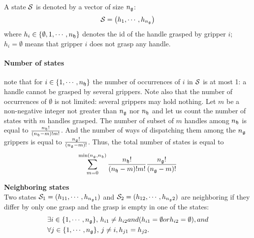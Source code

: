 A state $\mathcal{S}$ is denoted by a vector of size $n_{\mathfrak{g}}$:
\begin{equation}\label{eq:state}
\state = \left(h_1,\cdots,h_{\ngrippers}\right)
\end{equation}
where $h_i\in\{\emptyset,1,\cdots,n_{\mathfrak{h}}\}$ denotes the id of the handle grasped by gripper $i$; $h_i=\emptyset$ means that gripper $i$ does not grasp any handle.

\paragraph{Number of states} note that for $i\in\{1,\cdots,n_{\mathfrak{h}}\}$ the number of occurrences of $i$ in $\mathcal{S}$ is at most 1: a handle cannot be grasped by several grippers. Note also that the number of occurrences of $\emptyset$ is not limited: several grippers may hold nothing. Let $m$ be a non-negative integer not greater than $n_{\mathfrak{g}}$ nor $n_{\mathfrak{h}}$ and let us count the number of states with $m$ handles grasped. The number of subset of $m$ handles among $n_{\mathfrak{h}}$ is equal to $\frac{n_{\mathfrak{h}}!}{(n_{\mathfrak{h}}-m)!m!}$. And the number of ways of dispatching them among the $n_{\mathfrak{g}}$ grippers is equal to $\frac{n_{\mathfrak{g}}!}{(n_{\mathfrak{g}}-m)!}$. Thus, the total number of states is equal to
$$
\sum_{m=0}^{\min(n_{\mathfrak{g}},n_{\mathfrak{h}})} \frac{n_{\mathfrak{h}}!}{(n_{\mathfrak{h}}-m)!m!} \frac{n_{\mathfrak{g}}!}{(n_{\mathfrak{g}}-m)!}
$$
\begin{definition}\label{def:neighboring-states}\textbf{Neighboring states}\\
  Two states $\mathcal{S}_1=(h_{1 1},\cdots,h_{n_{\mathfrak{g}} 1})$ and $\mathcal{S}_2=(h_{1 2},\cdots,h_{n_{\mathfrak{g}} 2})$ are neighboring if they differ by only one grasp and the grasp is empty in one of the states:
  \begin{align*}
    &\exists i\in\{1,\cdots,n_{\mathfrak{g}}\},\,h_{i 1} \not= h_{i 2} \relax{ and } (h_{i 1}=\emptyset \relax{ or } h_{i 2}=\emptyset), \relax{ and }\\
    &\forall j\in\{1,\cdots,n_{\mathfrak{g}}\},\, j\not=i,h_{j 1} = h_{j 2}.
  \end{align*}
\end{definition}
